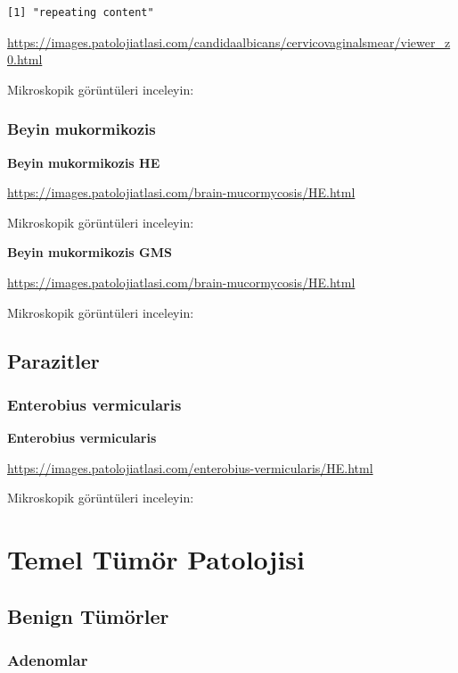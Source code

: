 \documentclass[
  letterpaper,
  DIV=11,
  numbers=noendperiod]{scrreprt}
\begin{document}
\begin{verbatim}
[1] "repeating content"
\end{verbatim}

\url{https://images.patolojiatlasi.com/candidaalbicans/cervicovaginalsmear/viewer_z0.html}

Mikroskopik görüntüleri inceleyin:

\hypertarget{beyin-mukormikozis}{%
\section{Beyin mukormikozis}\label{beyin-mukormikozis}}

\textbf{Beyin mukormikozis HE}

\url{https://images.patolojiatlasi.com/brain-mucormycosis/HE.html}

Mikroskopik görüntüleri inceleyin:

\textbf{Beyin mukormikozis GMS}

\url{https://images.patolojiatlasi.com/brain-mucormycosis/HE.html}

Mikroskopik görüntüleri inceleyin:

\hypertarget{parazitler}{%
\chapter{Parazitler}\label{parazitler}}

\hypertarget{enterobius-vermicularis}{%
\section{Enterobius vermicularis}\label{enterobius-vermicularis}}

\textbf{Enterobius vermicularis}

\url{https://images.patolojiatlasi.com/enterobius-vermicularis/HE.html}

Mikroskopik görüntüleri inceleyin:

\part{Temel Tümör Patolojisi}

\hypertarget{benign-tuxfcmuxf6rler}{%
\chapter{Benign Tümörler}\label{benign-tuxfcmuxf6rler}}

\hypertarget{adenomlar}{%
\section{Adenomlar}\label{adenomlar}}
\end{document}
